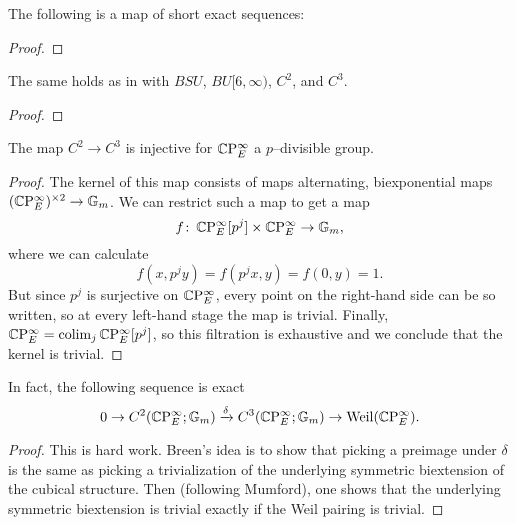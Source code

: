 \begin{theorem}
The following is a map of short exact sequences:
\begin{center}
\end{center}
\end{theorem}
\begin{proof}
\end{proof}

\begin{lemma}
The same holds as in  with $BSU$, $BU[6, \infty)$, $C^2$, and $C^3$.
\end{lemma}
\begin{proof}
\end{proof}

\begin{lemma}
The map $C^2 \to C^3$ is injective for $\mathbb{C}\mathrm P^\infty_E$ a $p$--divisible group.
\end{lemma}
\begin{proof}
The kernel of this map consists of maps alternating, biexponential maps $(\mathbb{C}\mathrm P^\infty_E)^{\times 2} \to \mathbb G_m$.  We can restrict such a map to get a map \[f \colon\thinspace \mathbb{C}\mathrm P^\infty_E[p^j] \times \mathbb{C}\mathrm P^\infty_E \to \mathbb G_m,\] where we can calculate \[f(x, p^j y) = f(p^j x, y) = f(0, y) = 1.\]  But since $p^j$ is surjective on $\mathbb{C}\mathrm P^\infty_E$, every point on the right-hand side can be so written, so at every left-hand stage the map is trivial.  Finally, $\mathbb{C}\mathrm P^\infty_E = \operatorname*{colim}_j \mathbb{C}\mathrm P^\infty_E[p^j]$, so this filtration is exhaustive and we conclude that the kernel is trivial.
\end{proof}

\begin{lemma}
In fact, the following sequence is exact \[0 \to C^2(\mathbb{C}\mathrm P^\infty_E; \mathbb G_m) \xrightarrow\delta C^3(\mathbb{C}\mathrm P^\infty_E; \mathbb G_m) \to \operatorname{Weil}(\mathbb{C}\mathrm P^\infty_E).\]
\end{lemma}
\begin{proof}
This is hard work.  Breen's idea is to show that picking a preimage under $\delta$ is the same as picking a trivialization of the underlying symmetric biextension of the cubical structure.  Then (following Mumford), one shows that the underlying symmetric biextension is trivial exactly if the Weil pairing is trivial.
\end{proof}

